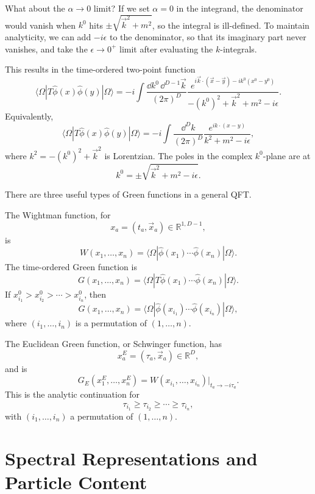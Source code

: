 What about the \(\alpha\to0\) limit? If we set \(\alpha=0\) in the integrand,
the denominator would vanish when \(k^0\) hits
\(\pm\sqrt{\vec k^2+m^2}\), so the integral is ill-defined. To maintain
analyticity, we can add \(-i\epsilon\) to the denominator, so that its
imaginary part never vanishes, and take the \(\epsilon\to0^+\) limit after
evaluating the \(k\)-integrals.

This results in the time-ordered two-point function
\[
  \langle\Omega|
  T\hat\phi(x)\hat\phi(y)
  |\Omega\rangle
  =
  -i
  \int
  \frac{\dd k^0\,\dd^{D-1}\vec k}{(2\pi)^D}
  \frac{
    e^{i\vec k\cdot(\vec x-\vec y)-ik^0(x^0-y^0)}
  }{
    -(k^0)^2+\vec k^2+m^2-i\epsilon
  }.
\]
Equivalently,
\[
  \langle\Omega|
  T\hat\phi(x)\hat\phi(y)
  |\Omega\rangle
  =
  -i
  \int\frac{\dd^D k}{(2\pi)^D}
  \frac{e^{ik\cdot(x-y)}}{k^2+m^2-i\epsilon},
\]
where \(k^2=-(k^0)^2+\vec k^2\) is Lorentzian. The poles in the complex
\(k^0\)-plane are at
\[
  k^0
  =
  \pm\sqrt{\vec k^2+m^2-i\epsilon}.
\]

There are three useful types of Green functions in a general QFT.

The Wightman function, for
\[
  x_a=(t_a,\vec x_a)\in\mathbb R^{1,D-1},
\]
is
\[
  W(x_1,\ldots,x_n)
  =
  \langle\Omega|
  \hat\phi(x_1)\cdots\hat\phi(x_n)
  |\Omega\rangle.
\]
The time-ordered Green function is
\[
  G(x_1,\ldots,x_n)
  =
  \langle\Omega|
  T\hat\phi(x_1)\cdots\hat\phi(x_n)
  |\Omega\rangle.
\]
If \(x_{i_1}^0>x_{i_2}^0>\cdots>x_{i_n}^0\), then
\[
  G(x_1,\ldots,x_n)
  =
  \langle\Omega|
  \hat\phi(x_{i_1})\cdots\hat\phi(x_{i_n})
  |\Omega\rangle,
\]
where \((i_1,\ldots,i_n)\) is a permutation of \((1,\ldots,n)\).

The Euclidean Green function, or Schwinger function, has
\[
  x_a^E=(\tau_a,\vec x_a)\in\mathbb R^D,
\]
and is
\[
  G_E(x_1^E,\ldots,x_n^E)
  =
  W(x_{i_1},\ldots,x_{i_n})
  \Big|_{t_a\to -i\tau_a}.
\]
This is the analytic continuation for
\[
  \tau_{i_1}\ge \tau_{i_2}\ge\cdots\ge\tau_{i_n},
\]
with \((i_1,\ldots,i_n)\) a permutation of \((1,\ldots,n)\).

\section{Spectral Representations and Particle Content}

